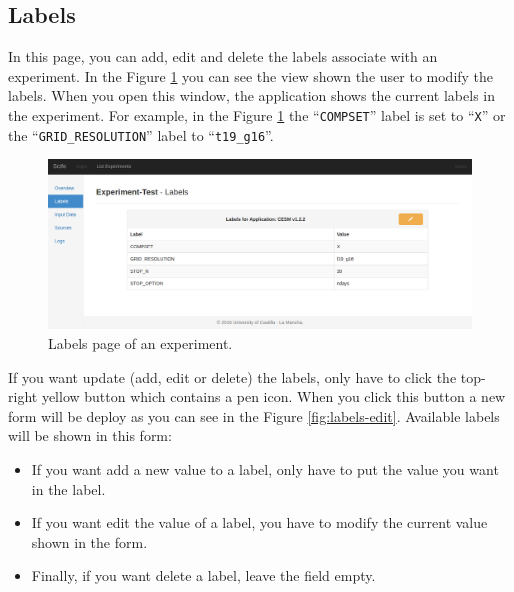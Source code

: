 \documentclass[11pt]{article}
\begin{document}
\subsection{Labels}\label{sec:labels}
In this page, you can add, edit and delete the labels associate with an experiment. In the Figure \ref{fig:labels} you can see the view shown the user to modify the labels. When you open this window, the application shows the current labels in the experiment. For example, in the Figure \ref{fig:labels} the ``\texttt{COMPSET}'' label is set to ``\texttt{X}'' or the ``\texttt{GRID\_RESOLUTION}'' label to ``\texttt{t19\_g16}''.
\begin{figure}[htp]
	\centering
	\includegraphics[width=\linewidth]{img/labels}
	\caption{Labels page of an experiment.}
	\label{fig:labels}
\end{figure}

If you want update (add, edit or delete) the labels, only have to click the top-right yellow button which contains a pen icon. When you click this button a new form will be deploy as you can see in the Figure \ref{fig:labels-edit}. Available labels will be shown in this form:
\begin{itemize}
	\item If you want add a new value to a label, only have to put the value you want in the label.
	\item If you want edit the value of a label, you have to modify the current value shown in the form.
	\item Finally, if you want delete a label, leave the field empty.
\end{itemize}
\end{document}
